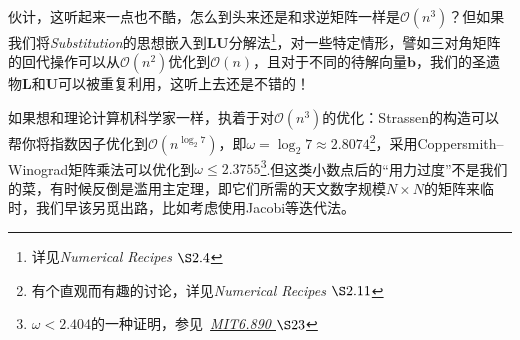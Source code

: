 伙计，这听起来一点也不酷，怎么到头来还是和求逆矩阵一样是$\mathcal{O}(n^3)$？但如果我们将\textit{Substitution}的思想嵌入到$\bm{LU}$分解法\footnote{详见\textit{Numerical Recipes $\S 2.4$}}，对一些特定情形，譬如三对角矩阵的回代操作可以从$\mathcal{O}(n^2)$优化到$\mathcal{O}(n)$，且对于不同的待解向量$\bm{b}$，我们的圣遗物$\bm{L}$和$\bm{U}$可以被重复利用，这听上去还是不错的！

如果想和理论计算机科学家一样，执着于对$\mathcal{O}(n^3)$的优化：Strassen的构造可以帮你将指数因子优化到$\mathcal{O}(n^{\log_2 7})$，即$\omega  = \log_2 7 \approx 2.8074$\footnote{有个直观而有趣的讨论，详见\textit{Numerical Recipes $\S 2.11$}}，采用Coppersmith–Winograd矩阵乘法可以优化到$\omega \le 2.3755$\footnote{$\omega < 2.404$的一种证明，参见\ \href{https://people.csail.mit.edu/virgi/6.890/lecture23.pdf}{\textit{MIT6.890 $\S 23$}}}.但这类小数点后的“用力过度”不是我们的菜，有时候反倒是滥用主定理，即它们所需的天文数字规模$N\times N$的矩阵来临时，我们早该另觅出路，比如考虑使用Jacobi等迭代法。